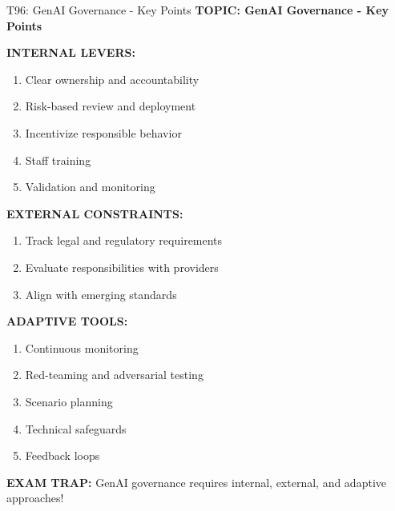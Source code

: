 \documentclass[8pt]{beamer}
\begin{document}
	\begin{frame}{T96: GenAI Governance - Key Points}
		\fontsize{6.5}{7.5}\selectfont
		\textbf{TOPIC: GenAI Governance - Key Points}
		
		\vspace{0.1cm}
		\textbf{INTERNAL LEVERS:}
		\begin{enumerate}
			\item Clear ownership and accountability
			\item Risk-based review and deployment
			\item Incentivize responsible behavior
			\item Staff training
			\item Validation and monitoring
		\end{enumerate}
		
		\vspace{0.1cm}
		\textbf{EXTERNAL CONSTRAINTS:}
		\begin{enumerate}
			\item Track legal and regulatory requirements
			\item Evaluate responsibilities with providers
			\item Align with emerging standards
		\end{enumerate}
		
		\vspace{0.1cm}
		\textbf{ADAPTIVE TOOLS:}
		\begin{enumerate}
			\item Continuous monitoring
			\item Red-teaming and adversarial testing
			\item Scenario planning
			\item Technical safeguards
			\item Feedback loops
		\end{enumerate}
		
		\textcolor{myred}{\textbf{EXAM TRAP:}} GenAI governance requires \textcolor{myblue}{internal, external, and adaptive approaches}!
	\end{frame}
	
\end{document}
